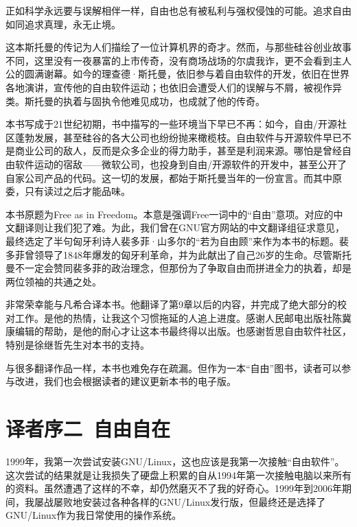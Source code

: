 正如科学永远要与误解相伴一样，自由也总有被私利与强权侵蚀的可能。追求自由如同追求真理，永无止境。

这本斯托曼的传记为人们描绘了一位计算机界的奇才。然而，与那些硅谷创业故事不同，这里没有一夜暴富的上市传奇，没有商场战场的尔虞我诈，更不会看到主人公的圆满谢幕。如今的理查德·斯托曼，依旧参与着自由软件的开发，依旧在世界各地演讲，宣传他的自由软件运动；也依旧会遭受人们的误解与不屑，被视作异类。斯托曼的执着与固执令他难见成功，也成就了他的传奇。

本书写成于21世纪初期，书中描写的一些环境当下早已不再：如今，自由/开源社区蓬勃发展，甚至硅谷的各大公司也纷纷抛来橄榄枝。自由软件与开源软件早已不是商业公司的敌人，反而是众多企业的得力助手，甚至是利润来源。哪怕是曾经自由软件运动的宿敌——微软公司，也投身到自由/开源软件的开发中，甚至公开了自家公司产品的代码。这一切的发展，都始于斯托曼当年的一份宣言。而其中原委，只有读过之后才能品味。

本书原题为Free as in Freedom。本意是强调Free一词中的``自由''意项。对应的中文翻译则让我们犯了难。为此，我们曾在GNU官方网站的中文翻译组征求意见，最终选定了半句匈牙利诗人裴多菲·山多尔的``若为自由顾''来作为本书的标题。裴多菲曾领导了1848年爆发的匈牙利革命，并为此献出了自己26岁的生命。尽管斯托曼不一定会赞同裴多菲的政治理念，但那份为了争取自由而拼进全力的执着，却是两位领袖的共通之处。

非常荣幸能与凡希合译本书。他翻译了第9章以后的内容，并完成了绝大部分的校对工作。是他的热情，让我这个习惯拖延的人追上进度。感谢人民邮电出版社陈冀康编辑的帮助，是他的耐心才让这本书最终得以出版。也感谢哲思自由软件社区，特别是徐继哲先生对本书的支持。

与很多翻译作品一样，本书也难免存在疏漏。但作为一本``自由''图书，读者可以参与改进，我们也会根据读者的建议更新本书的电子版。

\bigskip



\chapter{译者序二\ 自由自在}
\thispagestyle{empty}

1999年，我第一次尝试安装GNU/Linux，这也应该是我第一次接触``自由软件''。这次尝试的结果就是让我损失了硬盘上积累的自从1994年第一次接触电脑以来所有的资料。虽然遭遇了这样的不幸，却仍然磨灭不了我的好奇心。1999年到2006年期间，我屡战屡败地安装过各种各样的GNU/Linux发行版，但最终还是选择了GNU/Linux作为我日常使用的操作系统。

